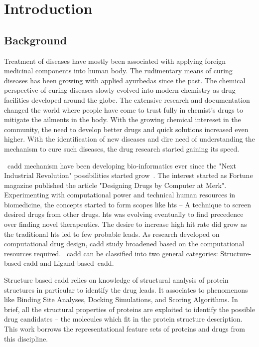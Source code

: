 \setcounter{page}{1}
\chapter{Introduction}
\section{Background}
Treatment of diseases have mostly been associated with applying foreign medicinal components into human body. The rudimentary means of curing diseases has been growing with applied ayurbedas since the past. The chemical perspective of curing diseases slowly evolved into modern chemistry as drug facilities developed around the globe. The extensive research and documentation changed the world where people have come to trust fully in chemist's drugs to mitigate the ailments in the body. With the growing chemical intereset in the community, the need to develop better drugs and quick solutions increased even higher. With the identification of new diseases and dire need of understanding the mechanism to cure such diseases, the drug research started gaining its speed.

~\acrfull{cadd} mechanism have been developing bio-informatics ever since the "Next Industrial Revolution" possibilities started grow~\cite{Leelananda2016,Brown2017}. The interest started as Fortune magazine published the article "Designing Drugs by Computer at Merk". Experimenting with computational power and technical human resources in biomedicine, the concepts started to form scopes like \acrfull{hts} -- A technique to screen desired drugs from other drugs. \acrshort{hts} was evolving eventually to find precedence over finding novel therapeutics. The desire to increase high hit rate did grow as the traditional \acrshort{hts} led to few probable leads. As research developed on computational drug design, \acrshort{cadd} study broadened based on the computational resources required. ~\acrshort{cadd} can be classified into two general categories: Structure-based \acrshort{cadd} and Ligand-based~\acrshort{cadd}.

Structure based \acrshort{cadd} relies on knowledge of structural analysis of protein structures in particular to identify the drug leads. It associates to phenomenons like Binding Site Analyses, Docking Simulations, and Scoring Algorithms. In brief, all the structural properties of proteins are exploited to identify the possible drug candidates -- the molecules which fit in the protein structure description. This work borrows the representational feature sets of proteins and drugs from this discipline.

